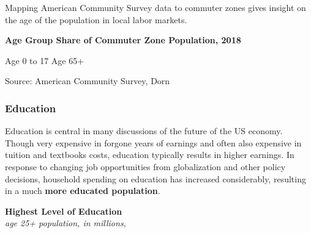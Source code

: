 \documentclass{report}
\newcommand{\tbllink}[1]{\href{https://raw.githubusercontent.com/bdecon/US-chartbook/master/chartbook/data/#1}{\faTable}}
\begin{document}
{{{\vspace{2mm}


\begin{minipage}{0.76\textwidth}
\small Mapping American Community Survey data to commuter zones gives insight on the age of the population in local labor markets.  \\



\end{minipage}
\vspace{3mm}

\noindent \normalsize \textbf{Age Group Share of Commuter Zone Population, 2018}

\hspace{2mm} Age 0 to 17 \hspace{62mm} Age 65+

\vspace{-3mm}
\hspace{-9mm}  \hspace{-3mm} 

\vspace{-3mm}
\footnotesize{Source: American Community Survey, Dorn} \hspace{61mm} \tbllink{acs_cz_age.csv}




\newpage


\begin{minipage}{0.76\textwidth}

\subsubsection*{\color{black!70} \seriffont Education}

\small Education is central in many discussions of the future of the US economy. Though very expensive in forgone years of earnings and often also expensive in tuition and textbooks costs, education typically results in higher earnings. In response to changing job opportunities from globalization and other policy decisions, household spending on education has increased considerably, resulting in a much \textbf{more educated population}.

\end{minipage}

\vspace{2mm}

\begin{minipage}{0.33\textwidth}
\small  
\end{minipage}\hspace{5mm}
\begin{minipage}{0.4\textwidth}
\noindent \normalsize \textbf{Highest Level of Education}\\
\footnotesize{\textit{age 25+ population, in millions, }}\\


\end{minipage}}}}
\end{document}
